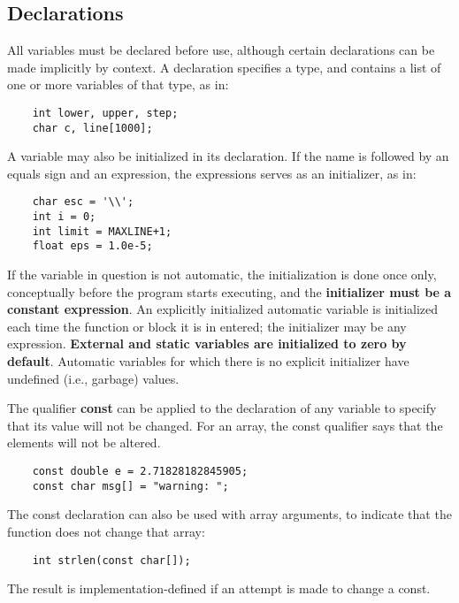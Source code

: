 \documentclass{article}
\begin{document}
\subsection{Declarations}

All variables must be declared before use, although certain declarations can be made implicitly by context. A declaration specifies a type, and contains a list of one or more variables of that type, as in:

\begin{lstlisting}
	int lower, upper, step;
	char c, line[1000];
\end{lstlisting}

A variable may also be initialized in its declaration. If the name is followed by an equals sign and an expression, the expressions serves as an initializer, as in:

\begin{lstlisting}
	char esc = '\\';
	int i = 0;
	int limit = MAXLINE+1;
	float eps = 1.0e-5;
\end{lstlisting}

If the variable in question is not automatic, the initialization is done once only, conceptually before the program starts executing, and the \textbf{initializer must be a constant expression}. An explicitly initialized automatic variable is initialized each time the function or block it is in entered; the initializer may be any expression. \textbf{External and static variables are initialized to zero by default}. Automatic variables for which there is no explicit initializer have undefined (i.e., garbage) values. 

The qualifier \textbf{const} can be applied to the declaration of any variable to specify that its value will not be changed. For an array, the const qualifier says that the elements will not be altered. 

\begin{lstlisting}
	const double e = 2.71828182845905;
	const char msg[] = "warning: ";
\end{lstlisting}

The const declaration can also be used with array arguments, to indicate that the function does not change that array:

\begin{lstlisting}
	int strlen(const char[]);
\end{lstlisting}

The result is implementation-defined if an attempt is made to change a const.
\end{document}
